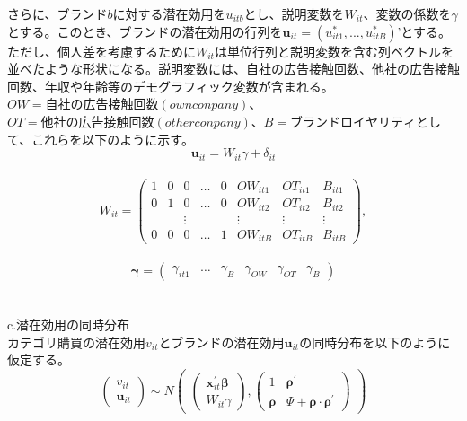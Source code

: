 \documentclass[11pt]{jsarticle}
\begin{document}
さらに、ブランド$b$に対する潜在効用を$u_{itb}$とし、説明変数を$W_{it}$、変数の係数を$\gamma$ とする。このとき、ブランドの潜在効用の行列を$\textbf{u}_{it} = (u_{it1}^{*},...,u_{itB}^{*})’$とする。ただし、個人差を考慮するために$W_{it}$は単位行列と説明変数を含む列ベクトルを並べたような形状になる。説明変数には、自社の広告接触回数、他社の広告接触回数、年収や年齢等のデモグラフィック変数が含まれる。$OW = 自社の広告接触回数(own conpany)$、$OT = 他社の広告接触回数(other conpany)$、$B = ブランドロイヤリティ$として、これらを以下のように示す。\\
\begin{equation} \label{formulab2}
\textbf{u}_{it} = W_{it}\gamma + \delta_{it}
\end{equation}\\
\begin{equation} \label{formulab3}
  W_{it} =
  \begin{pmatrix}
      1 & 0 & 0 & \ldots & 0 & OW_{it1} & OT_{it1} & B_{it1} \\
      0 & 1 & 0 & \ldots & 0 & OW_{it2} & OT_{it2} & B_{it2} \\
       &  & \vdots &  &  & \vdots & \vdots & \vdots \\
      0 & 0 & 0 & \ldots & 1 & OW_{itB} & OT_{itB} & B_{itB}
    \end{pmatrix}
    ,
\end{equation}\\
\begin{equation} \label{formulab4}
  \boldsymbol{\gamma} =
  \begin{pmatrix}
      \gamma_{it1} & \ldots & \gamma_{B} & \gamma_{OW} & \gamma_{OT} & \gamma_{B}
   \end{pmatrix}
\end{equation}\\
\\
c.潜在効用の同時分布\\
カテゴリ購買の潜在効用$v_{it}$とブランドの潜在効用$\textbf{u}_{it}$の同時分布を以下のように仮定する。\\
\begin{equation} \label{formulac1}
  \begin{pmatrix}
      v_{it} \\
      \textbf{u}_{it} 
   \end{pmatrix}
   \sim N
  \begin{pmatrix}
    \begin{pmatrix}
    \boldsymbol{x}^{\prime}_{it}\boldsymbol{\beta}\\
    W_{it}\gamma
    \end{pmatrix}
    ,
    \begin{pmatrix}
    1 & {\boldsymbol \rho}^\prime\\
    {\boldsymbol \rho} & \Psi + {\boldsymbol \rho} \cdot {\boldsymbol \rho}^\prime
    \end{pmatrix}
  \end{pmatrix}
\end{equation}\\
\end{document}
